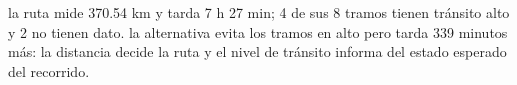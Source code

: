 {la ruta mide 370.54 km y tarda 7 h 27 min; 4 de sus 8 tramos tienen tránsito alto y 2 no tienen dato.}
{la alternativa evita los tramos en alto pero tarda 339 minutos más: la distancia decide la ruta y el nivel de tránsito informa del estado esperado del recorrido.}
